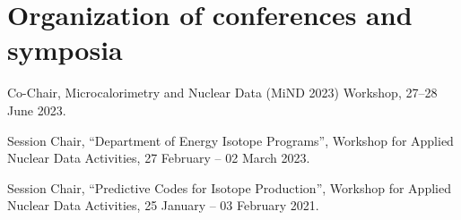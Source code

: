 \section{\sc Organization of conferences and symposia}

\begin{list2}

\item Co-Chair,  Microcalorimetry and Nuclear Data (MiND 2023) Workshop,  27--28 June 2023.

\item Session Chair, \enquote{Department of Energy Isotope Programs}, Workshop for Applied Nuclear Data Activities,  27 February -- 02 March 2023.

\item Session Chair, \enquote{Predictive Codes for Isotope Production}, Workshop for Applied Nuclear Data Activities,  25 January -- 03 February 2021.

\end{list2}
